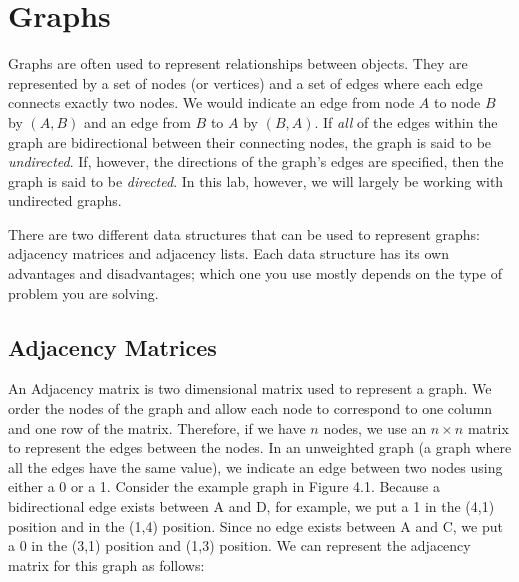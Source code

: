 \label{lab:SixDegreesKevinBacon}


\section*{Graphs}
Graphs are often used to represent relationships between objects. They are
represented by a set of nodes (or vertices) and a set of edges where each edge
connects exactly two nodes. We would indicate an edge from node $A$ to node $B$ by $(A, B)$
and an edge from $B$ to $A$ by $(B,A)$. If \emph{all} of the edges within the graph are bidirectional
between their connecting nodes, the graph is said to be \emph{undirected}. If, however, the directions
of the graph's edges are specified, then the graph is said to be \emph{directed}. In this lab, however, we will largely be working
with undirected graphs.

There are two different data structures that can be used to represent graphs: adjacency matrices and adjacency lists.
Each data structure has its own advantages and disadvantages;
which one you use mostly depends on the type of problem you are solving.

\subsection*{Adjacency Matrices}
An Adjacency matrix is two dimensional matrix used to represent a graph. We order
the nodes of the graph and allow each node to correspond to one column and one
row of the matrix. Therefore, if we have $n$ nodes, we use an $n \times n$ matrix to
represent the edges between the nodes. In an unweighted graph (a graph where all the edges have the same value), we indicate an
edge between two nodes using either a 0 or a 1.
Consider the example graph in Figure 4.1. Because a bidirectional edge exists between A and D, for example, we put a 1 in the (4,1) position and
in the (1,4) position. Since no edge exists between A and C, we put a 0 in
the (3,1) position and (1,3) position. We can represent the adjacency matrix for this graph as follows:

